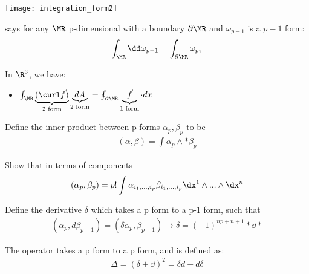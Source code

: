 \documentclass[11pt]{scrartcl}
\begin{document}
\texttt{[image: integration\_form2]}

\begin{theorem}
	 says for any $\MR$ p-dimensional with a boundary $\partial \MR$ and $\omega_{p-1}$ is a $p-1$ form:
	\begin{align}
		\int_{\MR} \dd \omega_{p-1} = \int_{\partial \MR} \omega_{p_1}
	\end{align}
\end{theorem}

\begin{example}
	In $\R^3$, we have:
	\begin{itemize}
		\item $\int_{\MR} \underbrace{(\curl \vec{f})}_{\text{2 form}} \underbrace{d A}_{\text{2 form}} = \oint_{\partial \MR} \underbrace{\vec{f}}_{\text{1-form}}  \cdot dx$
	\end{itemize}
\end{example}



\begin{definition}
	Define the inner product between p forms $\alpha_p, \beta_p$ to be
	\begin{align}
		(\alpha, \beta) = \int  \alpha_p \wedge *\beta_p
	\end{align}
\end{definition}


\begin{problem}
	Show that in terms of components
	\begin{align}
		(\alpha_p, \beta_p) = p! \int \alpha_{i_1, ..., i_p} \beta_{i_1, ..., i_p} \dx^1 \wedge ... \wedge \dx^n
	\end{align}
\end{problem}

\begin{definition}
	Define the  derivative $\delta$ which takes a p form to a p-1 form, such that
	\begin{align}
		(\alpha_p, d \beta_{p-1}) = (\delta \alpha_{p}, \beta_{p-1}) \rightarrow \delta = (-1)^{np + n + 1} * \dd *
	\end{align}
\end{definition}

\begin{definition}
	The  operator takes a p form to a p form, and is defined as:
	\begin{align}
		\Delta = (\delta  + \dd)^2 = \delta d + d \delta
	\end{align}
\end{definition}
\end{document}
